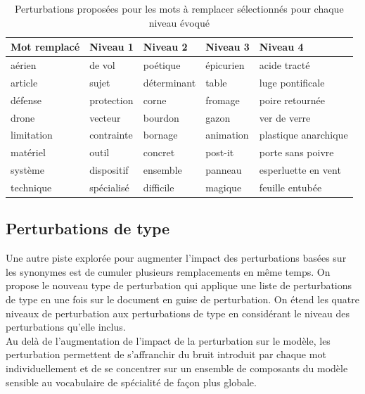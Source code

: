         
        \begin{table}
            \centering
            \begin{tabular}{|l||l|l|l|l|}
            \hline
                Mot remplacé & Niveau 1 & Niveau 2 & Niveau 3 & Niveau 4 \\ \hline \hline
                aérien & de vol & poétique & épicurien & acide tracté \\ \hline
                article & sujet & déterminant & table & luge pontificale \\ \hline
                défense & protection & corne & fromage & poire retournée \\ \hline
                drone & vecteur & bourdon & gazon & ver de verre \\ \hline
                limitation & contrainte & bornage & animation & plastique anarchique \\ \hline
                matériel & outil & concret & post-it & porte sans poivre \\ \hline
                système & dispositif & ensemble & panneau & esperluette en vent \\ \hline
                technique & spécialisé & difficile & magique & feuille entubée \\ \hline
            \end{tabular}
            \caption{Perturbations proposées pour les mots à remplacer sélectionnés pour chaque niveau évoqué}
            \label{tab:perturbations}
        \end{table}

    \subsection{Perturbations de type \fullreplace}

        Une autre piste explorée pour augmenter l'impact des perturbations basées sur les synonymes est de cumuler plusieurs remplacements en même temps. On propose le nouveau type de perturbation \fullreplace qui applique une liste de perturbations de type \replace en une fois sur le document en guise de perturbation.  On étend les quatre niveaux de perturbation aux perturbations de type \fullreplace en considérant le niveau des perturbations \replace qu'elle inclus. \\
        Au delà de l'augmentation de l'impact de la perturbation sur le modèle, les perturbation \fullreplace permettent de s'affranchir du bruit introduit par chaque mot individuellement et de se concentrer sur un ensemble de composants du modèle sensible au vocabulaire de spécialité de façon plus globale.

